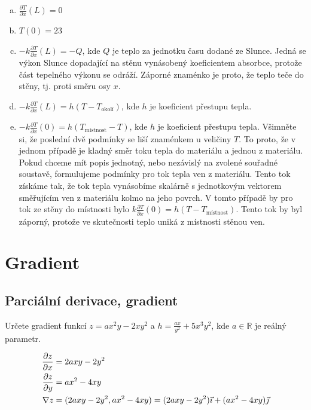\begin{enumerate}[a)]
\item $\frac{\partial T}{\partial x}(L)=0$
\item $T(0)=23$
\item $-k\frac{\partial T}{\partial x}(L)=-Q$, kde $Q$ je teplo za jednotku času dodané ze Slunce. Jedná se výkon Slunce dopadající na stěnu vynásobený koeficientem absorbce, protože část tepelného výkonu se odráží. Záporné znaménko je proto, že teplo teče do stěny, tj. proti směru osy $x$.
\item $-k\frac{\partial T}{\partial x}(L)=h(T-T_{\text{okolí}})$, kde $h$ je koeficient přestupu tepla.
\item $-k\frac{\partial T}{\partial x}(0)=h(T_{\text{místnost}}-T)$, kde $h$ je koeficient přestupu tepla.
  Všimněte si, že poslední dvě podmínky se liší znaménkem u veličiny $T$. To proto, že v jednom případě je kladný směr toku tepla do materiálu a jednou z materiálu. Pokud chceme mít popis jednotný, nebo nezávislý na zvolené souřadné soustavě, formulujeme podmínky pro tok tepla ven z materiálu. Tento tok získáme tak, že tok tepla vynásobíme skalárně s jednotkovým vektorem směřujícím ven z materiálu kolmo na jeho povrch. V tomto případě by pro tok ze stěny do místnosti bylo $k\frac{\partial T}{\partial x}(0)=h(T-T_{\text{místnost}})$. Tento tok by byl záporný, protože ve skutečnosti teplo uniká z místnosti stěnou ven.
\end{enumerate}
\konec


\section{Gradient}

\subsection{Parciální derivace, gradient}

Určete gradient funkcí $z=ax^2y-2xy^2$ a $h=\frac {ax}{y^2}+5x^3y^2$, kde $a\in\mathbb R$ je reálný parametr.

\reseni
\begin{align*}
  \pdv{z}{x} &= 2axy-2y^2\\
  \pdv{z}{y} &= ax^2-4xy\\
  \nabla z &= (2axy-2y^2, ax^2-4xy) = (2axy-2y^2)\vec \imath + (ax^2-4xy)\vec \jmath
\end{align*}
\konec


